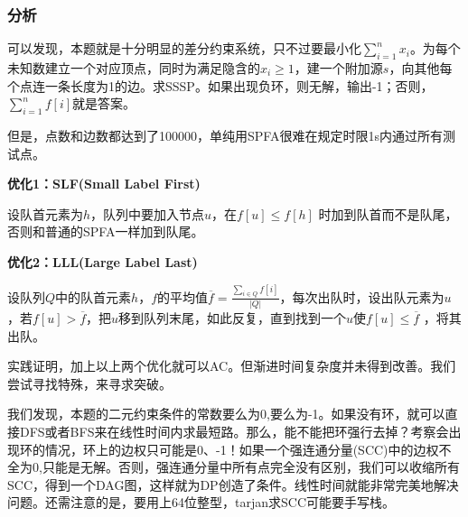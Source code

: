\subsubsection{分析}
可以发现，本题就是十分明显的差分约束系统，只不过要最小化$\sum_{i=1}^{n}{x_i}$。为每个未知数建立一个对应顶点，同时为满足隐含的$x_i \geq 1$，建一个附加源$s$，向其他每个点连一条长度为1的边。求SSSP。如果出现负环，则无解，输出-1；否则，$\sum_{i=1}^n{f[i]}$就是答案。
\par 但是，点数和边数都达到了100000，单纯用SPFA很难在规定时限1s内通过所有测试点。
\\[5pt]
\par 
\textbf{优化1：SLF(Small Label First)} 
\par 设队首元素为$h$，队列中要加入节点$u$，在$f[u] \leq f[h]$ 时加到队首而不是队尾，否则和普通的SPFA一样加到队尾。
\par 
\textbf{优化2：LLL(Large Label Last)} 
\par 设队列$Q$中的队首元素$h$，$f$的平均值$\overline{f} = \frac{\sum_{i \in Q} f[i]}{|Q|}$，每次出队时，设出队元素为$u$，若$f[u] > \overline{f}$，把$u$移到队列末尾，如此反复，直到找到一个$u$使$f[u] \leq \overline{f}$ ，将其出队。
\\[4pt] \par
实践证明，加上以上两个优化就可以AC。但渐进时间复杂度并未得到改善。我们尝试寻找特殊，来寻求突破。\par
我们发现，本题的二元约束条件的常数要么为0,要么为-1。如果没有环，就可以直接DFS或者BFS来在线性时间内求最短路。那么，能不能把环强行去掉？考察会出现环的情况，环上的边权只可能是0、-1！如果一个强连通分量(SCC)中的边权不全为0,只能是无解。否则，强连通分量中所有点完全没有区别，我们可以收缩所有SCC，得到一个DAG图，这样就为DP创造了条件。线性时间就能非常完美地解决问题。还需注意的是，要用上64位整型，tarjan求SCC可能要手写栈。
